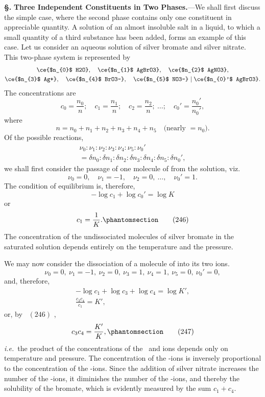 \documentclass[12pt]{book}[2005/09/16]
\newcommand{\Chg}[2]{#2}
\newcommand{\Add}[1]{\Chg{}{#1}}
\newcommand{\Section}[1]{
  \medskip\par\textbf{§\;#1}
  \label{section:#1}
}
\newcommand{\Tag}[1]{%
  \phantomsection\label{eqn:#1}\tag*{\ensuremath{#1}}%
}
\newcommand{\Eq}[1]{%
  \hyperref[eqn:#1]{\ensuremath{#1}}%
}
\newcommand{\PageSep}[1]{\ignorespaces}
\newcommand{\Topic}[1]{\textbf{#1}}
\newcommand{\ie}{\emph{i.e.}}
\begin{document}
\Section{277.} \Topic{Three Independent Constituents in Two
Phases.}---We shall first discuss the simple case, where the
second phase contains only one constituent in appreciable
quantity. A solution of an almost insoluble salt in a liquid,
to which a small quantity of a third substance has been
added, forms an example of this case. Let us consider an
aqueous solution of silver bromate and silver nitrate. This
%
%
two-phase system is represented by
\begin{multline*}
\ce{$n_{0}$ H2O},\quad
\ce{$n_{1}$ AgBrO3},\quad
\ce{$n_{2}$ AgNO3}, \\
\ce{$n_{3}$ Ag+},\quad
\ce{$n_{4}$ BrO3-},\quad
\ce{$n_{5}$ NO3-} \mid
\ce{$n_{0}'$ AgBrO3}.
\end{multline*}
\PageSep{260}
The concentrations are
\[
c_{0} = \frac{n_{0}}{n};\quad
c_{1} = \frac{n_{1}}{n};\quad
c_{2} = \frac{n_{2}}{n};\ \dots;\quad
c_{0}' = \frac{n_{0}'}{n_{0}'},
\]
where
\[
n = n_{0} + n_{1} + n_{2} + n_{3} + n_{4} + n_{5}\quad\text{(nearly $= n_{0}$).}
\]
Of the possible reactions,
\begin{multline*}
\nu_{0} : \nu_{1} : \nu_{2} : \nu_{3} : \nu_{4} : \nu_{5} : \nu_{0}' \\
  = \delta n_{0} : \delta n_{1} : \delta n_{2} : \delta n_{3} : \delta n_{4} : \delta n_{5} : \delta n_{0}',
\end{multline*}
we shall first consider the passage of one molecule of
 from the solution, viz.\
\[
\nu_{0} = 0,\quad
\nu_{1} = -1,\quad
\nu_{2} = 0,\ \dots\Add{,}\quad
\nu_{0}' = 1.
\]
The condition of equilibrium is, therefore,
\[
-\log c_{1} + \log c_{0}' = \log K
\]
or
\[
c_{1} = \frac{1}{K}.
\Tag{(246)}
\]
The concentration of the undissociated molecules of silver
bromate in the saturated solution depends entirely on the
temperature and the pressure.

We may now consider the dissociation of a molecule of
 into its two ions.
\[
\nu_{0} = 0,\
\nu_{1} = -1,\
\nu_{2} = 0,\
\nu_{3} = 1,\
\nu_{4} = 1,\
\nu_{5} = 0,\
\nu_{0}' = 0,
\]
and, therefore,
\begin{gather*}
-\log c_{1} + \log c_{3} + \log c_{4} = \log K', \\
\frac{c_{3} c_{4}}{c_{1}} = K',
\end{gather*}
or, by~\Eq{(246)},
\[
c_{3} c_{4} = \frac{K'}{K},
\Tag{(247)}
\]
\ie\ the product of the concentrations of the ~and 
ions depends only on temperature and pressure. The concentration
of the \ce{Ag+}-ions is inversely proportional to the
\PageSep{261}
concentration of the -ions. Since the addition of silver
nitrate increases the number of the -ions, it diminishes
the number of the -ions, and thereby the solubility of
the bromate, which is evidently measured by the sum $c_{1} + c_{4}$.
\end{document}
